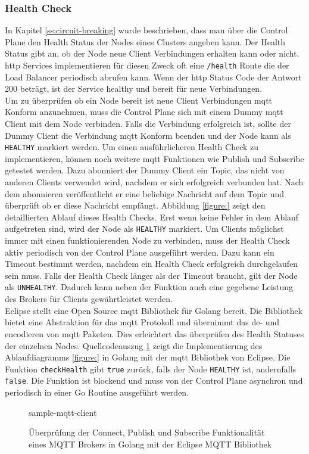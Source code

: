 \subsubsection{Health Check}
In Kapitel \ref{ss:circuit-breaking} wurde beschrieben, dass man über die Control Plane den Health Status der Nodes eines Clusters angeben kann. Der Health Status gibt an, ob der Node neue Client Verbindungen erhalten kann oder nicht.
\ac{http} Services implementieren für diesen Zweck oft eine \verb|/health| Route die der Load Balancer periodisch abrufen kann. Wenn der \ac{http} Status Code der Antwort 200 beträgt, ist der Service healthy und bereit für neue Verbindungen.
\\
Um zu überprüfen ob ein Node bereit ist neue Client Verbindungen \ac{mqtt} Konform anzunehmen, muss die Control Plane sich mit einem Dummy \ac{mqtt} Client mit dem Node verbinden. Falls die Verbindung erfolgreich ist, sollte der Dummy Client die Verbindung \ac{mqtt} Konform beenden und der Node kann als \verb|HEALTHY| markiert werden.
Um einen ausführlicheren Health Check zu implementieren, können noch weitere \ac{mqtt} Funktionen wie Publish und Subscribe getestet werden. Dazu abonniert der Dummy Client ein Topic, das nicht von anderen Clients verwendet wird, nachdem er sich erfolgreich verbunden hat. Nach dem abonnieren veröffentlicht er eine beliebige Nachricht auf dem Topic und überprüft ob er diese Nachricht empfängt. Abbildung \ref{figure:} zeigt den detaillierten Ablauf dieses Health Checks. Erst wenn keine Fehler in dem Ablauf aufgetreten sind, wird der Node als \verb|HEALTHY| markiert.
Um Clients möglichst immer mit einen funktionierenden Node zu verbinden, muss der Health Check aktiv periodisch von der Control Plane ausgeführt werden. Dazu kann ein Timeout bestimmt werden, nachdem ein Health Check erfolgreich durchgelaufen sein muss. Falls der Health Check länger als der Timeout braucht, gilt der Node als \verb|UNHEALTHY|. Dadurch kann neben der Funktion auch eine gegebene Leistung des Brokers für Clients gewährtleistet werden.
\\
Eclipse stellt eine Open Source \ac{mqtt} Bibliothek für Golang bereit.
Die Bibliothek bietet eine Abstraktion für das \ac{mqtt} Protokoll und übernimmt das de- und encodieren von \ac{mqtt} Paketen. Dies erleichtert das überprüfen des Health Statuses der einzelnen Nodes.
Quellcodeauszug \ref{code:sample-mqtt-client} zeigt die Implementierung des Ablaufdiagramms \ref{figure:} in Golang mit der \ac{mqtt} Bibliothek von Eclipse. Die Funktion \verb|checkHealth| gibt \verb|true| zurück, falls der Node \verb|HEALTHY| ist, andernfalls \verb|false|. Die Funktion ist blockend und muss von der Control Plane asynchron und periodisch in einer Go Routine ausgeführt werden.
\begin{figure}
    {sample-mqtt-client}
    \caption{Überprüfung der Connect, Publish und Subscribe Funktionalität eines MQTT Brokers in Golang mit der Eclipse MQTT Bibliothek}
    \label{code:sample-mqtt-client}
\end{figure}

